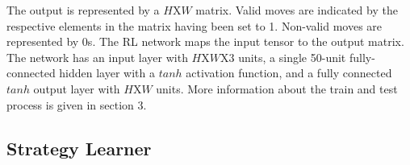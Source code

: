 The output is represented by a $H$X$W$ matrix. Valid moves are indicated by the respective elements in the matrix having been set to 1. Non-valid moves are represented by 0s.
The RL network maps the input tensor to the output matrix. The network has an input layer with $H$X$W$X$3$ units, a single 50-unit fully-connected hidden layer with a $tanh$ activation function, and a fully connected $tanh$ output layer with $H$X$W$ units. More information about the train and test process is given in section 3.

\subsection{Strategy Learner}
